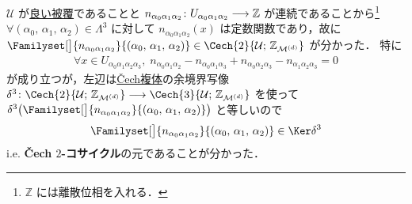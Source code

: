\documentclass[TQFT_main]{subfiles}
\begin{document}
$\mathcal{U}$ が\hyperref[def:good-cover]{良い被覆}であることと $n_{\alpha_0\alpha_1\alpha_2} \colon U_{\alpha_0\alpha_1\alpha_2} \longrightarrow \mathbb{Z}$ が連続であることから\footnote{$\mathbb{Z}$ には離散位相を入れる．}$\forall (\alpha_0,\, \alpha_1,\, \alpha_2) \in \Lambda^3$ に対して $n_{\alpha_0\alpha_1\alpha_2}(x)$ は定数関数であり，故に $\Familyset[\big]{n_{\alpha_0\alpha_1\alpha_2}}{(\alpha_0,\, \alpha_1,\, \alpha_2)} \in \Cech{2}{\mathcal{U};\, \mathbb{Z}_{\mfdcal{M}{d}}}$ が分かった．
特に
\begin{align}
    \forall x \in U_{\alpha_0\alpha_1\alpha_2\alpha_3},\; n_{\alpha_0\alpha_1\alpha_2} - n_{\alpha_0\alpha_1\alpha_3} + n_{\alpha_0\alpha_2\alpha_3} - n_{\alpha_1\alpha_2\alpha_3} = 0
\end{align}
が成り立つが，左辺は\hyperref[def:Cech-cobaundarymap]{\v{C}ech複体}の余境界写像 $\delta^3 \colon \Cech{2}{\mathcal{U};\, \mathbb{Z}_{\mfdcal{M}{d}}} \lto  \Cech{3}{\mathcal{U};\, \mathbb{Z}_{\mfdcal{M}{d}}}$ を使って $\delta^3 \bigl(\Familyset[\big]{n_{\alpha_0\alpha_1\alpha_2}}{(\alpha_0,\, \alpha_1,\, \alpha_2)}\bigr)$ と等しいので
\begin{align}
    \Familyset[\big]{n_{\alpha_0\alpha_1\alpha_2}}{(\alpha_0,\, \alpha_1,\, \alpha_2)} \in \Ker \delta^3
\end{align}
i.e. \textbf{\v{C}ech $2$-コサイクル}の元であることが分かった．
\end{document}
